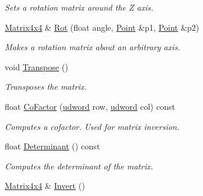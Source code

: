 \begin{DoxyCompactItemize}
\begin{DoxyCompactList}\small\item\em Sets a rotation matrix around the Z axis. \end{DoxyCompactList}\item 
\hyperlink{classMatrix4x4}{Matrix4x4} \& \hyperlink{classMatrix4x4_a34cb9027eb16313063f06a45835715aa}{Rot} (float angle, \hyperlink{classPoint}{Point} \&p1, \hyperlink{classPoint}{Point} \&p2)\hypertarget{classMatrix4x4_a34cb9027eb16313063f06a45835715aa}{}\label{classMatrix4x4_a34cb9027eb16313063f06a45835715aa}

\begin{DoxyCompactList}\small\item\em Makes a rotation matrix about an arbitrary axis. \end{DoxyCompactList}\item 
void \hyperlink{classMatrix4x4_a8d34646055a4572f3504d1f07a21a89e}{Transpose} ()\hypertarget{classMatrix4x4_a8d34646055a4572f3504d1f07a21a89e}{}\label{classMatrix4x4_a8d34646055a4572f3504d1f07a21a89e}

\begin{DoxyCompactList}\small\item\em Transposes the matrix. \end{DoxyCompactList}\item 
float \hyperlink{classMatrix4x4_afc8239c94e440436630123a1ac2b24df}{Co\+Factor} (\hyperlink{IceTypes_8h_a44c6f1920ba5551225fb534f9d1a1733}{udword} row, \hyperlink{IceTypes_8h_a44c6f1920ba5551225fb534f9d1a1733}{udword} col) const \hypertarget{classMatrix4x4_afc8239c94e440436630123a1ac2b24df}{}\label{classMatrix4x4_afc8239c94e440436630123a1ac2b24df}

\begin{DoxyCompactList}\small\item\em Computes a cofactor. Used for matrix inversion. \end{DoxyCompactList}\item 
float \hyperlink{classMatrix4x4_a0c106185086895c738f6dd356096df64}{Determinant} () const \hypertarget{classMatrix4x4_a0c106185086895c738f6dd356096df64}{}\label{classMatrix4x4_a0c106185086895c738f6dd356096df64}

\begin{DoxyCompactList}\small\item\em Computes the determinant of the matrix. \end{DoxyCompactList}\item 
\hyperlink{classMatrix4x4}{Matrix4x4} \& \hyperlink{classMatrix4x4_a0b405e13d25636b081fa88b407a9e1e8}{Invert} ()\hypertarget{classMatrix4x4_a0b405e13d25636b081fa88b407a9e1e8}{}\label{classMatrix4x4_a0b405e13d25636b081fa88b407a9e1e8}


\end{DoxyCompactItemize}
